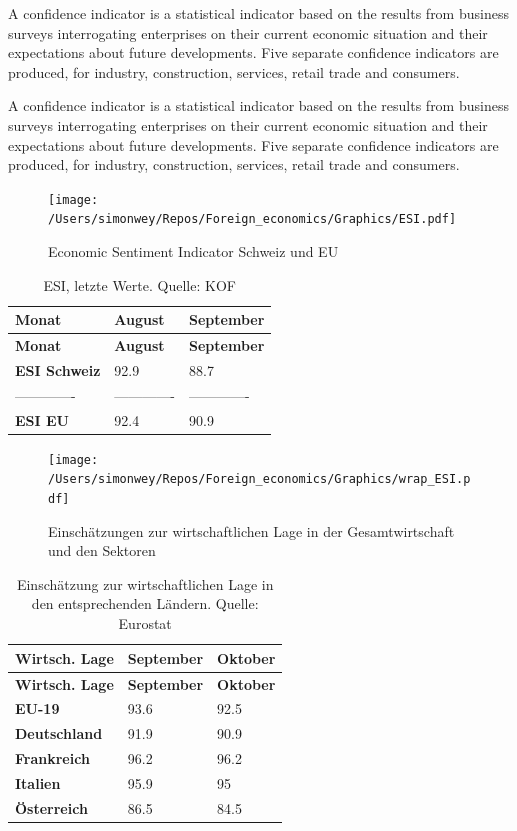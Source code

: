 \documentclass[
]{article}
\begin{document}
A confidence indicator is a statistical indicator based on the results
from business surveys interrogating enterprises on their current
economic situation and their expectations about future developments.
Five separate confidence indicators are produced, for industry,
construction, services, retail trade and consumers.

A confidence indicator is a statistical indicator based on the results
from business surveys interrogating enterprises on their current
economic situation and their expectations about future developments.
Five separate confidence indicators are produced, for industry,
construction, services, retail trade and consumers.

\begin{figure}[] \centering
\texttt{[image: /Users/simonwey/Repos/Foreign\_economics/Graphics/ESI.pdf]}
\caption{Economic Sentiment Indicator Schweiz und EU} 
\label{Inf_M_W}
\end{figure}

\begin{longtable}[]{@{}lll@{}}
\caption{ESI, letzte Werte. Quelle: KOF}\tabularnewline
\toprule
\textbf{Monat} & \textbf{August} & \textbf{September} \\
\midrule
\endfirsthead
\toprule
\textbf{Monat} & \textbf{August} & \textbf{September} \\
\midrule
\endhead
\textbf{ESI Schweiz} & 92.9 & 88.7 \\
------------- & ------------- & ------------- \\
\textbf{ESI EU} & 92.4 & 90.9 \\
\bottomrule
\end{longtable}

\begin{figure}[h] \centering
\texttt{[image: /Users/simonwey/Repos/Foreign\_economics/Graphics/wrap\_ESI.pdf]}
\caption{Einschätzungen zur wirtschaftlichen Lage in der Gesamtwirtschaft und den Sektoren} 
\label{Inf_M_W}
\end{figure}

\begin{longtable}[]{@{}lll@{}}
\caption{Einschätzung zur wirtschaftlichen Lage in den entsprechenden
Ländern. Quelle: Eurostat}\tabularnewline
\toprule
\textbf{Wirtsch. Lage} & \textbf{September} & \textbf{Oktober} \\
\midrule
\endfirsthead
\toprule
\textbf{Wirtsch. Lage} & \textbf{September} & \textbf{Oktober} \\
\midrule
\endhead
\textbf{EU-19} & 93.6 & 92.5 \\
\textbf{Deutschland} & 91.9 & 90.9 \\
\textbf{Frankreich} & 96.2 & 96.2 \\
\textbf{Italien} & 95.9 & 95 \\
\textbf{Österreich} & 86.5 & 84.5 \\
\bottomrule
\end{longtable}
\end{document}
